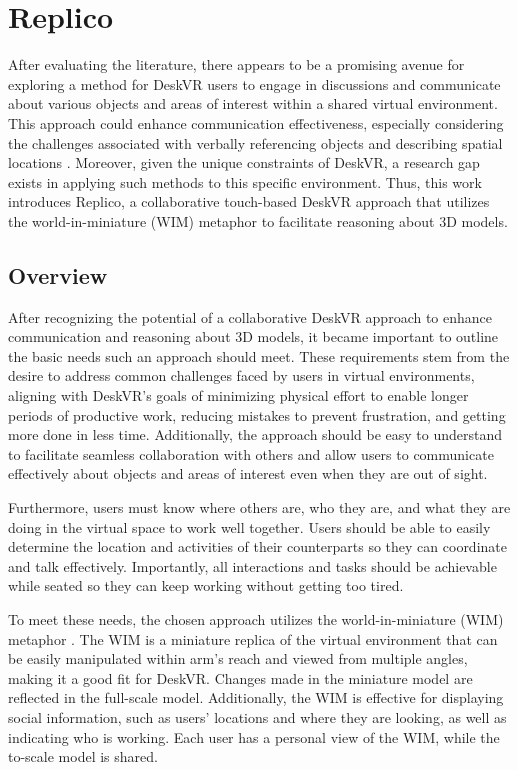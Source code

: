 \chapter{Replico}\label{chap:method}

    After evaluating the literature, there appears to be a promising avenue for exploring a method for DeskVR users to engage in discussions and communicate about various objects and areas of interest within a shared virtual environment. This approach could enhance communication effectiveness, especially considering the challenges associated with verbally referencing objects and describing spatial locations \cite{odaVirtualReplicasRemote2015}. Moreover, given the unique constraints of DeskVR, a research gap exists in applying such methods to this specific environment. Thus, this work introduces Replico, a collaborative touch-based DeskVR approach that utilizes the world-in-miniature (WIM) \cite{stoakleyVirtualRealityonaWim1995} metaphor to facilitate reasoning about 3D models.

\section{Overview} \label{sec:overview}

    After recognizing the potential of a collaborative DeskVR approach to enhance communication and reasoning about 3D models, it became important to outline the basic needs such an approach should meet. These requirements stem from the desire to address common challenges faced by users in virtual environments, aligning with DeskVR's goals of minimizing physical effort to enable longer periods of productive work, reducing mistakes to prevent frustration, and getting more done in less time. Additionally, the approach should be easy to understand to facilitate seamless collaboration with others and allow users to communicate effectively about objects and areas of interest even when they are out of sight.

    Furthermore, users must know where others are, who they are, and what they are doing in the virtual space to work well together. Users should be able to easily determine the location and activities of their counterparts so they can coordinate and talk effectively. Importantly, all interactions and tasks should be achievable while seated so they can keep working without getting too tired.

    To meet these needs, the chosen approach utilizes the world-in-miniature (WIM) metaphor \cite{stoakleyVirtualRealityonaWim1995}. The WIM is a miniature replica of the virtual environment that can be easily manipulated within arm's reach and viewed from multiple angles, making it a good fit for DeskVR. Changes made in the miniature model are reflected in the full-scale model. Additionally, the WIM is effective for displaying social information, such as users' locations and where they are looking, as well as indicating who is working. Each user has a personal view of the WIM, while the to-scale model is shared.

